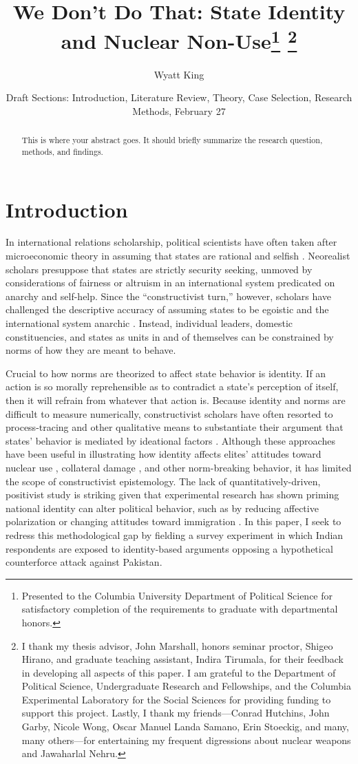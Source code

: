 \documentclass[12pt]{article}
\title{We Don't Do That: State Identity and Nuclear Non-Use\footnote{Presented to the Columbia University Department of Political Science for satisfactory completion of the requirements to graduate with departmental honors.} \footnote{I thank my thesis advisor, John Marshall, honors seminar proctor, Shigeo Hirano, and graduate teaching assistant, Indira Tirumala, for their feedback in developing all aspects of this paper. I am grateful to the Department of Political Science, Undergraduate Research and Fellowships, and the Columbia Experimental Laboratory for the Social Sciences for providing funding to support this project. Lastly, I thank my friends—Conrad Hutchins, John Garby, Nicole Wong, Oscar Manuel Landa Samano, Erin Stoeckig, and many, many others—for entertaining my frequent digressions about nuclear weapons and Jawaharlal Nehru.}}
\author{Wyatt King}
\date{Draft Sections: Introduction, Literature Review, Theory, Case Selection, Research Methods, February 27}
\begin{document}
\maketitle
\begin{abstract} 
\noindent
This is where your abstract goes. It should briefly summarize the research question,
methods, and findings.
\end{abstract}

\newpage


\section{Introduction}
In international relations scholarship, political scientists have often taken after microeconomic theory in assuming that states are rational and selfish \citep{waltz_man_2001}. Neorealist scholars presuppose that states are strictly security seeking, unmoved by considerations of fairness or altruism in an international system predicated on anarchy and self-help. Since the “constructivist turn,” however, scholars have challenged the descriptive accuracy of assuming states to be egoistic and the international system anarchic \citep{wendt_social_1999, finnemore_international_1998, wendt_anarchy_1992}. Instead, individual leaders, domestic constituencies, and states as units in and of themselves can be constrained by norms of how they are meant to behave. 

Crucial to how norms are theorized to affect state behavior is identity. If an action is so morally reprehensible as to contradict a state's perception of itself, then it will refrain from whatever that action is. Because identity and norms are difficult to measure numerically, constructivist scholars have often resorted to process-tracing and other qualitative means to substantiate their argument that states' behavior is mediated by ideational factors \citep{peez_contributions_2022}. Although these approaches have been useful in illustrating how identity affects elites' attitudes toward nuclear use \citep{tannenwald_nuclear_2007}, collateral damage \citep{crawford_accountability_2013}, and other norm-breaking behavior, it has limited the scope of constructivist epistemology. The lack of quantitatively-driven, positivist study is striking given that experimental research has shown priming national identity can alter political behavior, such as by reducing affective polarization \citep{levendusky_americans_2018} or changing attitudes toward immigration \citep{wojcieszak_social_2018}. In this paper, I seek to redress this methodological gap by fielding a survey experiment in which Indian respondents are exposed to identity-based arguments opposing a hypothetical counterforce attack against Pakistan. 
\end{document}
